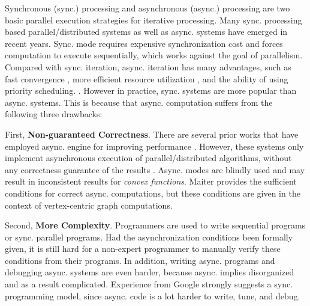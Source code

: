 Synchronous (sync.) processing and asynchronous (async.) processing are two basic parallel execution strategies for iterative processing. Many sync. processing based parallel/distributed systems \cite{Malewicz2010Pregel,Dean:2004:MSD:1251254.1251264,giraph,maiter,Fan:2017:PSG:3035918.3035942,Malewicz2010Pregel,8017445,Low:2012:DGF:2212351.2212354} as well as async. systems \cite{Low:2012:DGF:2212351.2212354, Tian:2013:TLV:2732232.2732238, Han:2015:GUB:2777598.2777604, grace, ppopp2017} have emerged in recent years. Sync. mode requires expensive synchronization cost and forces computation to execute sequentially, which works against the goal of parallelism. Compared with sync. iteration, async. iteration has many advantages, such as fast convergence \cite{maiter}, more efficient resource utilization \cite{priori-cidr}, and the ability of using priority scheduling. \cite{Zhang:2011:PDF:2038916.2038929}. However in practice, sync. systems are more popular than async. systems. This is because that async. computation suffers from the following three drawbacks:

First, \textbf{Non-guaranteed Correctness}. There are several prior works that have employed async. engine for improving performance \cite{Low:2012:DGF:2212351.2212354, Tian:2013:TLV:2732232.2732238, Han:2015:GUB:2777598.2777604, grace, ppopp2017}. However, these systems only implement asynchronous execution of parallel/distributed algorithms, without any correctness guarantee of the results \cite{Low:2012:DGF:2212351.2212354}. Async. modes are blindly used and may result in inconsistent results for \emph{convex functions}. Maiter \cite{maiter} provides the sufficient conditions for correct async. computations, but these conditions are given in the context of vertex-centric graph computations.

Second, \textbf{More Complexity}. Programmers are used to write sequential programs or sync. parallel programs. Had the asynchronization conditions been formally given, it is still hard for a non-expert programmer to manually verify these conditions from their programs. In addition, writing async. programs and debugging async. systems are even harder, because async. implies disorganized and as a result complicated. Experience from Google \cite{Malewicz2010Pregel} strongly suggests a sync. programming model, since async. code is a lot harder to write, tune, and debug.

